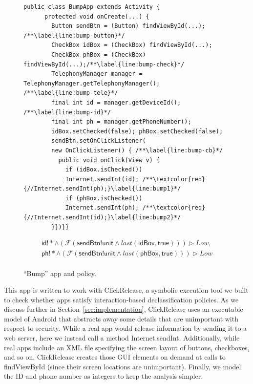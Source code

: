 \documentclass{llncs}
\newcommand{\code}[1]{\textsf{#1}} %
\newcommand{\toolname}{ClickRelease\xspace}
\newcommand{\tfuture}{\mathcal{F}}
\newcommand{\tlast}[2]{\textit{last}(#1, #2)}
\begin{document}
\begin{figure}[t]
  \centering
  \begin{lstlisting}[name=Ex]
    public class BumpApp extends Activity {
      protected void onCreate(...) {
        Button sendBtn = (Button) findViewById(...); /**\label{line:bump-button}*/
        CheckBox idBox = (CheckBox) findViewById(...);
        CheckBox phBox = (CheckBox) findViewById(...);/**\label{line:bump-check}*/
        TelephonyManager manager = TelephonyManager.getTelephonyManager(); /**\label{line:bump-tele}*/
        final int id = manager.getDeviceId(); /**\label{line:bump-id}*/
        final int ph = manager.getPhoneNumber();
        idBox.setChecked(false); phBox.setChecked(false);
        sendBtn.setOnClickListener(
        new OnClickListener() { /**\label{line:bump-cb}*/
          public void onClick(View v) {
            if (idBox.isChecked())
            Internet.sendInt(id); /**\textcolor{red}{//Internet.sendInt(ph);}\label{line:bump1}*/
            if (phBox.isChecked())
            Internet.sendInt(ph); /**\textcolor{red}{//Internet.sendInt(id);}\label{line:bump2}*/
        }})}}
  \end{lstlisting}
  \begin{displaymath}
    \begin{array}{cc}
      \code{id}!\ast \wedge (\tfuture ( \code{sendBtn!unit} \land
      \tlast{\code{idBox}}{\code{true}})) \rhd Low, \\

      \code{ph}!\ast \wedge (\tfuture (
      \code{sendBtn!unit} \land
      \tlast{\code{phBox}}{\code{true}})) \rhd Low \\
    \end{array}
  \end{displaymath}
  \caption{``Bump'' app and policy.}
  \label{fig:app-bump}
\end{figure}

This app is written to work with \toolname{}, a symbolic execution tool we built to check
whether apps satisfy interaction-based declassification policies. As we
discuss further in Section~\ref{sec:implementation}, \toolname{} uses an
executable model of Android that abstracts away some details that are
unimportant with respect to security. While a real app would release
information by sending it to a web server, here we instead call a
method \code{Internet.sendInt}. Additionally, while real apps
include an XML file specifying the screen layout of buttons,
checkboxes, and so on, \toolname{} creates those GUI elements
on demand at calls to \code{findViewById} (since their screen locations are
unimportant). Finally, we model the ID and phone number as
integers to keep the analysis simpler.
\end{document}
